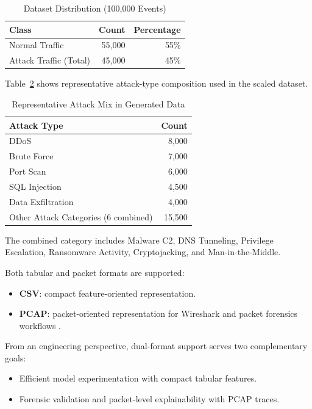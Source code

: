 \documentclass[conference]{IEEEtran}
\begin{document}
\begin{table}[h]
\centering
\caption{Dataset Distribution (100,000 Events)}
\label{tab:distribution}
\begin{tabular}{lrr}
\toprule
Class & Count & Percentage \\
\midrule
Normal Traffic & 55,000 & 55\% \\
Attack Traffic (Total) & 45,000 & 45\% \\
\bottomrule
\end{tabular}
\end{table}

Table~\ref{tab:attackmix} shows representative attack-type composition used in the scaled dataset.

\begin{table}[h]
\centering
\caption{Representative Attack Mix in Generated Data}
\label{tab:attackmix}
\footnotesize
\setlength{\tabcolsep}{4pt}
\begin{tabular}{p{}r}
\toprule
\textbf{Attack Type} & \textbf{Count} \\
\midrule
DDoS & 8,000 \\
Brute Force & 7,000 \\
Port Scan & 6,000 \\
SQL Injection & 4,500 \\
Data Exfiltration & 4,000 \\
Other Attack Categories (6 combined) & 15,500 \\
\bottomrule
\end{tabular}
\end{table}

The combined category includes Malware C2, DNS Tunneling, Privilege Escalation, Ransomware Activity, Cryptojacking, and Man-in-the-Middle.

Both tabular and packet formats are supported:
\begin{itemize}
    \item \textbf{CSV}: compact feature-oriented representation.
    \item \textbf{PCAP}: packet-oriented representation for Wireshark and packet forensics workflows \cite{wireshark,scapy}.
\end{itemize}

From an engineering perspective, dual-format support serves two complementary goals:
\begin{itemize}
    \item Efficient model experimentation with compact tabular features.
    \item Forensic validation and packet-level explainability with PCAP traces.
\end{itemize}
\end{document}
